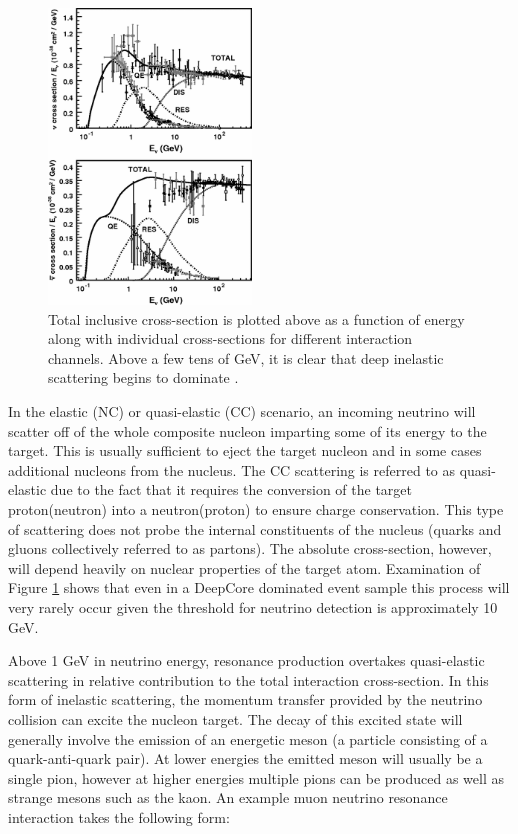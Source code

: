 \documentclass{gatech-thesis}
\begin{document}
\begin{figure}
  \begin{center}
    \includegraphics[width=0.48\textwidth,keepaspectratio]{neutrino_nucelon_crosssections.png}
  \end{center}
  \caption[Neutrino-nucleon Cross-section by Energy]{Total inclusive cross-section is plotted above as a function of energy along with individual cross-sections for different interaction channels. Above a few tens of GeV, it is clear that deep inelastic scattering begins to dominate \cite{2012RvMP...84.1307F}.}
  \label{fig:neutrino_scattering}
\end{figure}

In the elastic (NC) or quasi-elastic (CC) scenario, an incoming neutrino will scatter off of the whole composite nucleon imparting some of its energy to the target. This is usually sufficient to eject the target nucleon and in some cases additional nucleons from the nucleus. The CC scattering is referred to as quasi-elastic due to the fact that it requires the conversion of the target proton(neutron) into a neutron(proton) to ensure charge conservation. This type of scattering does not probe the internal constituents of the nucleus (quarks and gluons collectively referred to as partons). The absolute cross-section, however, will depend heavily on nuclear properties of the target atom. Examination of Figure \ref{fig:neutrino_scattering} shows that even in a DeepCore dominated event sample this process will very rarely occur given the threshold for neutrino detection is approximately 10 GeV.

Above 1 GeV in neutrino energy, resonance production overtakes quasi-elastic scattering in relative contribution to the total interaction cross-section. In this form of inelastic scattering, the momentum transfer provided by the neutrino collision can excite the nucleon target. The decay of this excited state will generally involve the emission of an energetic meson (a particle consisting of a quark-anti-quark pair). At lower energies the emitted meson will usually be a single pion, however at higher energies multiple pions can be produced as well as strange mesons such as the kaon. An example muon neutrino resonance interaction takes the following form:
\end{document}
